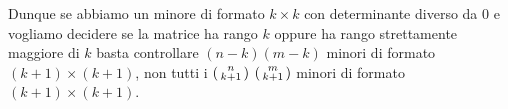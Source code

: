 Dunque se abbiamo un minore di formato $k \times k$ con determinante diverso da 0
e vogliamo decidere se la matrice ha rango $k$ oppure ha rango strettamente
maggiore di $k$ basta controllare $(n - k)(m - k)$ minori di formato
$(k + 1) \times (k + 1)$, non tutti i
$\begin{psmallmatrix} n \\ k + 1 \end{psmallmatrix}$
$\begin{psmallmatrix} m \\ k + 1 \end{psmallmatrix}$ minori di formato
$(k + 1) \times (k + 1)$.

